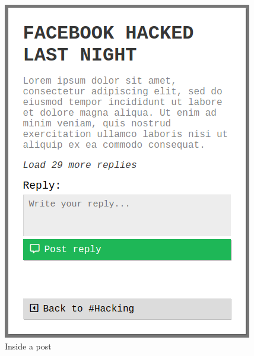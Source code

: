 \begin{table}[H]
\begin{minipage}{.33\textwidth}
\begin{figure}[H]
            \includegraphics[width=0.95\linewidth]{InteraktionsDesign/Assets/Prototype/7.png}
            \caption{Inside a post}
            \label{fig:prototype7}
        \end{figure}
    \end{minipage}
    \begin{minipage}{.33\textwidth}
        \begin{figure}[H]
            \centering

\end{figure}
\end{minipage}
\end{table}
